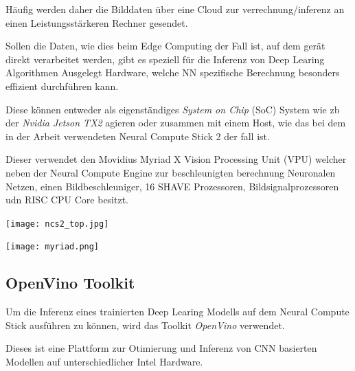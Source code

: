 Häufig werden daher die Bilddaten über eine Cloud zur 
verrechnung/inferenz an einen Leistungsstärkeren 
Rechner gesendet.

Sollen die Daten, wie dies beim Edge Computing der Fall ist, 
auf dem gerät direkt verarbeitet werden, gibt es speziell 
für die Inferenz von Deep Learing Algorithmen Ausgelegt 
Hardware, welche NN spezifische Berechnung besonders 
effizient durchführen kann.

Diese können entweder als eigenständiges \textit{System on Chip}
(SoC) System wie zb der \textit{Nvidia Jetson TX2} agieren oder 
zusammen mit einem Host, wie das bei dem in der Arbeit verwendeten 
Neural Compute Stick 2 der fall ist.

Dieser verwendet den Movidius Myriad X Vision Processing Unit (VPU)
welcher neben der Neural Compute Engine zur beschleunigten berechnung 
Neuronalen Netzen, einen Bildbeschleuniger, 16 SHAVE Prozessoren, 
Bildsignalprozessoren udn RISC CPU Core besitzt.
\cite{haussermannFunktionUndEffizienz}
\\[1cm]
\begin{minipage}{0.4\textwidth}
    \centering
    \label{fig:ncs2}
    \texttt{[image: ncs2\_top.jpg]}
\end{minipage}
\begin{minipage}{0.6\textwidth}
    \centering
    \label{fig:myriad}
    \texttt{[image: myriad.png]}
\end{minipage}


\subsection{OpenVino Toolkit}



Um die Inferenz eines trainierten Deep Learing Modells auf dem
Neural Compute Stick ausführen zu können, wird das Toolkit 
\textit{OpenVino} verwendet.

Dieses ist eine Plattform zur Otimierung und Inferenz von 
CNN basierten Modellen auf unterschiedlicher Intel Hardware.

